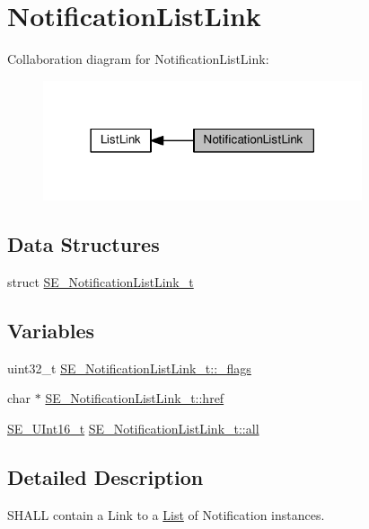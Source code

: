 \hypertarget{group__NotificationListLink}{}\section{Notification\+List\+Link}
\label{group__NotificationListLink}
Collaboration diagram for Notification\+List\+Link\+:\nopagebreak
\begin{figure}[H]
\begin{center}
\leavevmode
\includegraphics[width=266pt]{group__NotificationListLink}
\end{center}
\end{figure}
\subsection*{Data Structures}
\begin{DoxyCompactItemize}
\item 
struct \hyperlink{structSE__NotificationListLink__t}{S\+E\+\_\+\+Notification\+List\+Link\+\_\+t}
\end{DoxyCompactItemize}
\subsection*{Variables}
\begin{DoxyCompactItemize}
\item 
uint32\+\_\+t \hyperlink{group__NotificationListLink_ga5023938637f32b603975b8a403a27bee}{S\+E\+\_\+\+Notification\+List\+Link\+\_\+t\+::\+\_\+flags}
\item 
char $\ast$ \hyperlink{group__NotificationListLink_ga5813d265b0bfb7682fca2205bd5ad8a5}{S\+E\+\_\+\+Notification\+List\+Link\+\_\+t\+::href}
\item 
\hyperlink{group__UInt16_gac68d541f189538bfd30cfaa712d20d29}{S\+E\+\_\+\+U\+Int16\+\_\+t} \hyperlink{group__NotificationListLink_ga313276d3b11f3056bd8e5ec14bcc3b12}{S\+E\+\_\+\+Notification\+List\+Link\+\_\+t\+::all}
\end{DoxyCompactItemize}


\subsection{Detailed Description}
S\+H\+A\+LL contain a Link to a \hyperlink{structList}{List} of Notification instances. 

